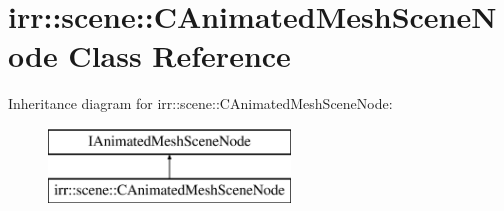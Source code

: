 \hypertarget{classirr_1_1scene_1_1_c_animated_mesh_scene_node}{\section{irr\-:\-:scene\-:\-:C\-Animated\-Mesh\-Scene\-Node Class Reference}
\label{classirr_1_1scene_1_1_c_animated_mesh_scene_node}
}
Inheritance diagram for irr\-:\-:scene\-:\-:C\-Animated\-Mesh\-Scene\-Node\-:\begin{figure}[H]
\begin{center}
\leavevmode
\includegraphics[height=2.000000cm]{classirr_1_1scene_1_1_c_animated_mesh_scene_node}
\end{center}
\end{figure}
